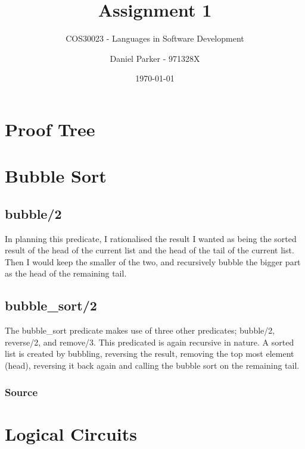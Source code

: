 \documentclass[11pt, english, numbers=endperiod]{scrartcl}
\title{Assignment 1}
\subtitle{COS30023 - Languages in Software Development}
\author{Daniel Parker - 971328X}
\date{\today}
\begin{document}
\maketitle

\section{Proof Tree}


\section{Bubble Sort}
\subsection{bubble/2}
In planning this predicate, I rationalised the result I wanted as being the sorted result of the head of the current list and the head of the tail of the current list. Then I would keep the smaller of the two, and recursively bubble the bigger part as the head of the remaining tail.

\subsection{bubble\_sort/2}
The bubble\_sort predicate makes use of three other predicates; bubble/2, reverse/2, and remove/3. This predicated is again recursive in nature. A sorted list is created by bubbling, reversing the result, removing the top most element (head), reversing it back again and calling the bubble sort on the remaining tail.

\subsubsection{Source}


\section{Logical Circuits}
\end{document}
